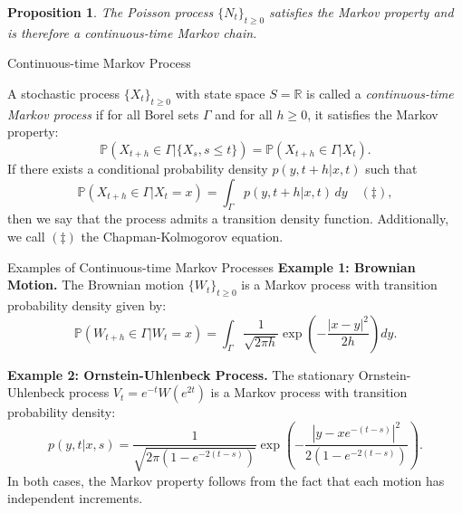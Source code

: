 \documentclass[aspectratio=169,xcolor=dvipsnames]{beamer}
\newtheorem{proposition}{Proposition}
\begin{document}
\begin{frame}
    \begin{proposition}
    The Poisson process $\{N_t\}_{t \geq 0}$ satisfies the Markov property and is therefore a continuous-time Markov chain.
    \end{proposition}
\end{frame}
\begin{frame}{Continuous-time Markov Process}
    \begin{definition}
        A stochastic process $\{X_t\}_{t \geq 0}$ with state space $S = \mathbb{R}$ is called a \textit{continuous-time Markov process} if for all Borel sets $\Gamma$ and for all $h \geq 0$, it satisfies the Markov property:
        $$
        \mathbb{P}(X_{t+h} \in \Gamma | \{X_s, s \leq t\}) = \mathbb{P}(X_{t+h} \in \Gamma | X_t).
        $$
        If there exists a conditional probability density $p(y, t+h | x, t)$ such that
        $$
        \mathbb{P}(X_{t+h} \in \Gamma | X_t = x) = \int_{\Gamma} p(y, t+h | x, t) \, dy \quad \left(\ddagger\right),
        $$
        then we say that the process admits a transition density function. Additionally, we call $\left(\ddagger\right)$ the Chapman-Kolmogorov equation.
    \end{definition}
\end{frame}


\begin{frame}{Examples of Continuous-time Markov Processes}
    \textbf{Example 1: Brownian Motion.} The Brownian motion $\{W_t\}_{t \geq 0}$ is a Markov process with transition probability density given by:
    $$
    \mathbb{P}(W_{t+h} \in \Gamma | W_t = x) = \int_{\Gamma} \frac{1}{\sqrt{2\pi h}} \exp \left( -\frac{|x - y|^2}{2h} \right) dy.
    $$

    \vspace{0.4cm}
    
    \textbf{Example 2: Ornstein-Uhlenbeck Process.} The stationary Ornstein-Uhlenbeck process $V_t = e^{-t} W(e^{2t})$ is a Markov process with transition probability density:
    $$
    p(y, t | x, s) = \frac{1}{\sqrt{2\pi(1 - e^{-2(t-s)})}} \exp \left( -\frac{|y - x e^{-(t-s)}|^2}{2(1 - e^{-2(t-s)})} \right).
    $$
In both cases, the Markov property follows from the fact that each motion has independent increments.
\end{frame}
\end{document}
